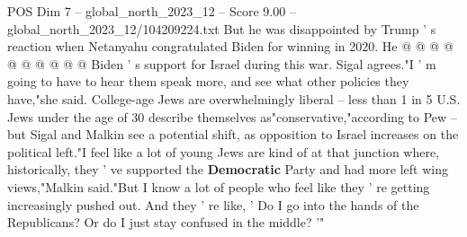 \begin{textsample}{POS Dim 7 – global\_north\_2023\_12 – Score 9.00 – global\_north\_2023\_12/104209224.txt}
But he was disappointed by Trump ' s reaction when Netanyahu congratulated Biden for winning in 2020.
He @ @ @ @ @ @ @ @ @ @ Biden ' s support for Israel during this war.
Sigal agrees."I ' m going to have to hear them speak more, and see what other policies they have,"she said.
College-age Jews are overwhelmingly liberal -- less than 1 in 5 U.S.
Jews under the age of 30 describe themselves as"conservative,"according to Pew -- but Sigal and Malkin see a potential shift, as opposition to Israel increases on the political left."I feel like a lot of young Jews are kind of at that junction where, historically, they ' ve supported the \textbf{Democratic} Party and had more left wing views,"Malkin said."But I know a lot of people who feel like they ' re getting increasingly pushed out.
And they ' re like, ' Do I go into the hands of the Republicans?
Or do I just stay confused in the middle? '"

\end{textsample}

